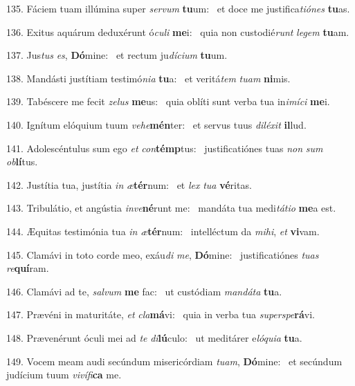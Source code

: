 135. Fáciem tuam illúmina super \textit{ser}\textit{vum} \textbf{tu}um: \ast\  et doce me justifica\textit{ti}\textit{ó}\textit{nes} \textbf{tu}as.\

136. Exitus aquárum deduxérunt ó\textit{cu}\textit{li} \textbf{me}i: \ast\  quia non custodié\textit{runt} \textit{le}\textit{gem} \textbf{tu}am.\

137. Jus\textit{tus} \textit{es}, \textbf{Dó}mine: \ast\  et rectum ju\textit{dí}\textit{ci}\textit{um} \textbf{tu}um.\

138. Mandásti justítiam testimó\textit{ni}\textit{a} \textbf{tu}a: \ast\  et veritá\textit{tem} \textit{tu}\textit{am} \textbf{ni}mis.\

139. Tabéscere me fecit \textit{ze}\textit{lus} \textbf{me}us: \ast\  quia oblíti sunt verba tua in\textit{i}\textit{mí}\textit{ci} \textbf{me}i.\

140. Ignítum elóquium tuum \textit{ve}\textit{he}\textbf{mén}ter: \ast\  et servus tuus \textit{di}\textit{lé}\textit{xit} \textbf{il}lud.\

141. Adolescéntulus sum ego \textit{et} \textit{con}\textbf{témp}tus: \ast\  justificatiónes tuas \textit{non} \textit{sum} \textit{ob}\textbf{lí}tus.\

142. Justítia tua, justítia \textit{in} \textit{æ}\textbf{tér}num: \ast\  et \textit{lex} \textit{tu}\textit{a} \textbf{vé}ritas.\

143. Tribulátio, et angústia \textit{in}\textit{ve}\textbf{né}runt me: \ast\  mandáta tua medi\textit{tá}\textit{ti}\textit{o} \textbf{me}a est.\

144. Æquitas testimónia tua \textit{in} \textit{æ}\textbf{tér}num: \ast\  intelléctum da \textit{mi}\textit{hi}, \textit{et} \textbf{vi}vam.\

145. Clamávi in toto corde meo, exáu\textit{di} \textit{me}, \textbf{Dó}mine: \ast\  justificatiónes \textit{tu}\textit{as} \textit{re}\textbf{quí}ram.\

146. Clamávi ad te, \textit{sal}\textit{vum} \textbf{me} fac: \ast\  ut custódiam \textit{man}\textit{dá}\textit{ta} \textbf{tu}a.\

147. Prævéni in maturitáte, \textit{et} \textit{cla}\textbf{má}vi: \ast\  quia in verba tua \textit{su}\textit{per}\textit{spe}\textbf{rá}vi.\

148. Prævenérunt óculi mei ad \textit{te} \textit{di}\textbf{lú}culo: \ast\  ut meditárer e\textit{ló}\textit{qui}\textit{a} \textbf{tu}a.\

149. Vocem meam audi secúndum misericórdiam \textit{tu}\textit{am}, \textbf{Dó}mine: \ast\  et secúndum judícium tuum \textit{vi}\textit{ví}\textit{fi}\textbf{ca} me.\


